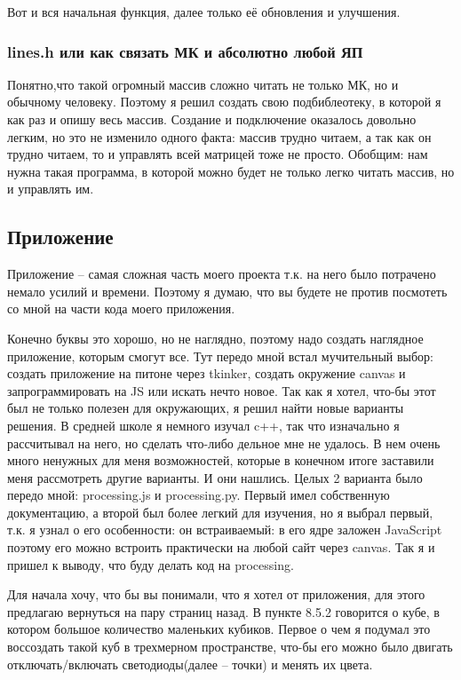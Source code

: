 \documentclass[a4paper, 12pt]{article}
\begin{document}
Вот и вся начальная функция, далее только её обновления и улучшения.

\subsubsection{lines.h или как связать МК и абсолютно любой ЯП}

Понятно,что такой огромный массив сложно читать не только МК, но и обычному
человеку. Поэтому я решил создать свою подбиблеотеку, в которой я как раз
и опишу весь массив. Создание и подключение оказалось довольно легким, но это
не изменило одного факта: массив трудно читаем, а так как он трудно читаем, то
и управлять всей матрицей тоже не просто. Обобщим: нам нужна такая программа,
в которой можно будет не только легко читать массив, но и управлять им.

\subsection{Приложение}

Приложение -- самая сложная часть моего проекта т.к. на него было потрачено
немало усилий и времени. Поэтому я думаю, что вы будете не против посмотеть со
мной на части кода моего приложения.

Конечно буквы это хорошо, но не наглядно, поэтому надо создать наглядное
приложение, которым смогут все. Тут передо мной встал мучительный выбор:
создать приложение на питоне через tkinker, создать окружение canvas и
запрограммировать на JS или искать нечто новое. Так как я хотел, что-бы этот
был не только полезен для окружающих, я решил найти новые варианты решения.
В средней школе я немного изучал c++, так что изначально я рассчитывал на него,
но сделать что-либо дельное мне не удалось. В нем очень много ненужных для
меня возможностей, которые в конечном итоге заставили меня рассмотреть другие
варианты. И они нашлись. Целых 2 варианта было передо мной: processing.js и
processing.py. Первый имел собственную документацию, а второй был более легкий
для изучения, но я выбрал первый, т.к. я узнал о его особенности: он
встраиваемый: в его ядре заложен JavaScript поэтому его можно встроить
практически на любой сайт через canvas. Так я и пришел к выводу, что буду
делать код на processing.

Для начала хочу, что бы вы понимали, что я хотел от приложения, для этого
предлагаю вернуться на пару страниц назад. В пункте 8.5.2 говорится о кубе,
в котором большое количество маленьких кубиков. Первое о чем я подумал это
воссоздать такой куб в трехмерном пространстве, что-бы его можно было двигать
отключать/включать светодиоды(далее -- точки) и менять их цвета.
\end{document}
